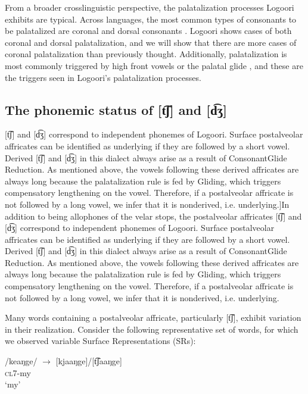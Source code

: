 \documentclass[output=paper]{langsci/langscibook}
\begin{document}
From a broader crosslinguistic perspective, the palatalization processes Logoori exhibits are typical. Across languages, the most common types of consonants to be palatalized are coronal and dorsal consonants \citep{Bateman2011}. Logoori shows cases of both coronal and dorsal palatalization, and we will show that there are more cases of coronal palatalization than previously thought. Additionally, palatalization is most commonly triggered by high front vowels or the palatal glide \citep{Bateman2011}, and these are the triggers seen in Logoori’s palatalization processes.

\subsection{The phonemic status of [t͡ʃ] and [d͡ʒ]} %
[t͡ʃ] and [d͡ʒ{]} correspond to independent phonemes of Logoori. Surface postalveolar affricates can be identified as underlying if they are followed by a short vowel. Derived [t͡ʃ{]} and [d͡ʒ{]} in this dialect always arise as a result of ConsonantGlide Reduction. As mentioned above, the vowels following these derived affricates are always long because the palatalization rule is fed by Gliding, which triggers compensatory lengthening on the vowel. Therefore, if a postalveolar affricate is not followed by a long vowel, we infer that it is nonderived, i.e. underlying.]{\textmd{In addition to being allophones of the velar stops, the postalveolar affricates [t͡ʃ] and [d͡ʒ] correspond to independent phonemes of Logoori. Surface postalveolar affricates can be identified as underlying if they are followed by a short vowel. Derived [t͡ʃ] and [d͡ʒ] in this dialect always arise as a result of ConsonantGlide Reduction. As mentioned above, the vowels following these derived affricates are always long because the palatalization rule is fed by Gliding, which triggers compensatory lengthening on the vowel. Therefore, if a postalveolar affricate is not followed by a long vowel, we infer that it is nonderived, i.e. underlying.}}

Many words containing a postalveolar affricate, particularly [t͡ʃ], exhibit variation in their realization. Consider the following representative set of words, for which we observed variable Surface Representations (SRs): 


\ea\label{ex:glewwe:11}{}
  \ea\label{ex:glewwe:11a}
 /keaŋge/  $\rightarrow$ [kjaaŋge]/[t͡ʃaaŋge]\\{}
\textsc{cl7}-my\\{}
\glt ‘my’
\end{document}

